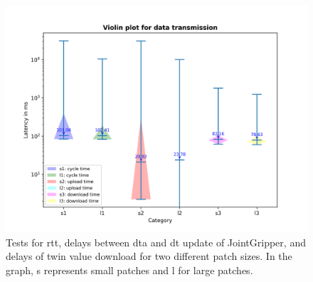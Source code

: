 \begin{figure}[htb]
    \centering
    \includegraphics[width=\textwidth]{figures/tests/DT/violin_patch_size.png}
    \caption{Tests for \gls{rtt}, delays between \gls{dta} and \gls{dt} 
    update of JointGripper, and delays of twin value download for 
    two different patch sizes. In the graph, s represents small patches 
    and l for large patches.\label{fig: UD-violin-patchsize}}
\end{figure}

